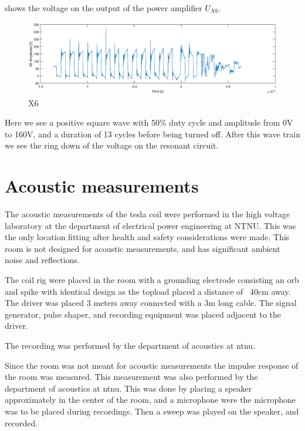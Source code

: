  shows the voltage on the output of the power amplifier $U_{X6}$.

\begin{figure}[H]
    \centering
    \includegraphics[trim={3.2cm 0cm 3.2cm 0cm},clip,width=\textwidth]{img/X6singlepulse.eps}
    \caption{X6}
    \label{fig:m_x6}
\end{figure}

Here we see a positive square wave with 50\% duty cycle and amplitude from 0V to 160V, and a duration of 13 cycles before being turned off. After this wave train we see the ring down of the voltage on the resonant circuit.

\newpage
\section{Acoustic measurements}

The acoustic measurements of the tesla coil were performed in the high voltage laboratory at the department of electrical power engineering at NTNU. This was the only location fitting after health and safety considerations were made. This room is not designed for acoustic measurements, and has significant ambient noise and reflections.

The coil rig were placed in the room with a grounding electrode consisting an orb and spike with identical design as the topload placed a distance of ~40cm away. The driver was placed 3 meters away connected with a 3m long cable. The signal generator, pulse shaper, and recording equipment was placed adjacent to the driver.

The recording was performed by the department of acoustics at ntnu.

Since the room was not meant for acoustic measurements the impulse response of the room was measured. This measurement was also performed by the department of acoustics at ntnu. This was done by placing a speaker approximately in the center of the room, and a microphone were the microphone was to be placed during recordings. Then a sweep was played on the speaker, and recorded.

